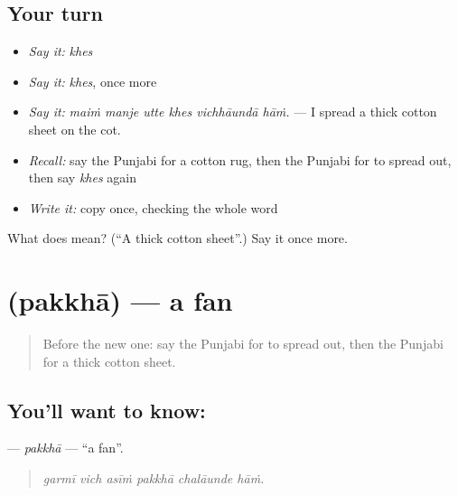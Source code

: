 \subsection*{Your turn}
\begin{itemize}
\raggedright
  \item \emph{Say it:} \emph{khes}
  \item \emph{Say it:} \emph{khes}, once more
  \item \emph{Say it:} \emph{maiṁ manje utte khes vichhāundā hāṁ.} — I spread a thick cotton sheet on the cot.
  \item \emph{Recall:} say the Punjabi for a cotton rug, then the Punjabi for to spread out, then say \emph{khes} again
  \item \emph{Write it:} copy \textbf{} once, checking the whole word
\end{itemize}

\begin{tcolorbox}[breakable,colback=teal!4,colframe=teal!35!black,title={Before you move on}]
What does  mean? (\textquotedblleft{}A thick cotton sheet\textquotedblright{}.) Say it once more.
\end{tcolorbox}
\section[\texorpdfstring{\pa{ਪੱਖਾ} (pakkhā)}{ਪੱਖਾ (pakkhā)}]{ (pakkhā) — a fan}

\label{lesson:PA-C233-pakkha}



\begin{quote}
Before the new one: say the Punjabi for to spread out, then the Punjabi for a thick cotton sheet.
\end{quote}

\subsection*{You'll want to know: }
\textbf{} — \emph{pakkhā} — \textquotedblleft{}a fan\textquotedblright{}.

\begin{quote}
     
\end{quote}

\begin{quote}
\emph{garmī vich asīṁ pakkhā chalāunde hāṁ.}
\end{quote}

